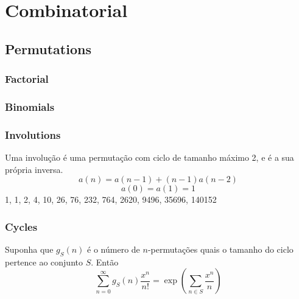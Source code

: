 \newcommand*{\Comb}[2]{{}^{#1}C_{#2}}%
\newcommand{\stirlingfirst}[2]{\genfrac{[}{]}{0pt}{}{#1}{#2}}
\newcommand{\stirlingsecond}[2]{\genfrac{\{}{\}}{0pt}{}{#1}{#2}}

\chapter{Combinatorial}

\section{Permutations}
	\subsection{Factorial}
		
\subsection{Binomials}

 \subsection{Involutions}
    Uma involução é uma permutação com ciclo de tamanho máximo 2, e é a sua própria inversa.
    $$a(n) = a(n-1) + (n-1)a(n-2)$$
    $$a(0) = a(1) = 1$$
    1, 1, 2, 4, 10, 26, 76, 232, 764, 2620, 9496, 35696, 140152\\ \hfill

\subsection{Cycles}
		Suponha que $g_S(n)$ é o número de $n$-permutações quais o tamanho do ciclo pertence ao conjunto $S$. Então
		\small
		$$\sum_{n=0} ^\infty g_S(n) \frac{x^n}{n!} = \exp\left(\sum_{n\in S} \frac{x^n} {n} \right)$$
		\normalsize

	
